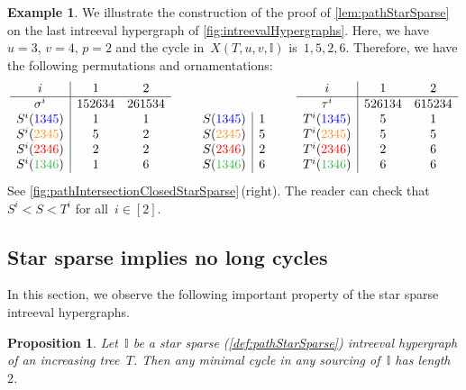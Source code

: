 \documentclass{amsart}
\newtheorem{proposition}[theorem]{Proposition}
\theoremstyle{definition}
\newtheorem{example}[theorem]{Example}
\newcommand{\blue}[1]{{\color{blue} #1}} %
\newcommand{\red}[1]{{\color{red} #1}} %
\newcommand{\green}[1]{{\color{green} #1}} %
\newcommand{\orange}[1]{{\color{orange} #1}} %
\newcommand{\II}{\mathbb I} %
\begin{document}
\begin{example}
\label{exm:pathStarSparse}
We illustrate the construction of the proof of \cref{lem:pathStarSparse} on the last intreeval hypergraph of \cref{fig:intreevalHypergraphs}.
Here, we have~$u = 3$, $v = 4$, $p = 2$ and the cycle in~$X(T, u, v, \II)$ is~$1, 5, 2, 6$.
Therefore, we have the following permutations and ornamentations:
\[
\begin{array}[b]{c|cc}
	i & 1 & 2 \\ 
	\hline
	\sigma^i & 152634 & 261534 \\
	S^i(\blue{1345}) & 1 & 1 \\
	S^i(\orange{2345}) & 5 & 2 \\
	S^i(\red{2346}) & 2 & 2 \\
	S^i(\green{1346}) & 1 & 6 \\
\end{array}
\qquad
\begin{array}[b]{c|c}
	S(\blue{1345}) & 1 \\
	S(\orange{2345}) & 5 \\
	S(\red{2346}) & 2 \\
	S(\green{1346}) & 6 \\
\end{array}
\qquad
\begin{array}[b]{c|cc}
	i & 1 & 2 \\ 
	\hline
	\tau^i & 526134 & 615234 \\
	T^i(\blue{1345}) & 5 & 1 \\
	T^i(\orange{2345}) & 5 & 5 \\
	T^i(\red{2346}) & 2 & 6 \\
	T^i(\green{1346}) & 6 & 6 \\
\end{array}
\]
See \cref{fig:pathIntersectionClosedStarSparse}\,(right).
The reader can check that~$S^i < S < T^i$ for all~$i \in [2]$.
\end{example}


\subsection{Star sparse implies no long cycles}
\label{subsec:shortCycles}

In this section, we observe the following important property of the star sparse intreeval hypergraphs.

\begin{proposition}
\label{prop:pathStarSparse}
Let~$\II$ be a star sparse (\cref{def:pathStarSparse}) intreeval hypergraph of an increasing tree~$T$.
Then any minimal cycle in any sourcing of~$\II$ has length~$2$.
\end{proposition}
\end{document}
